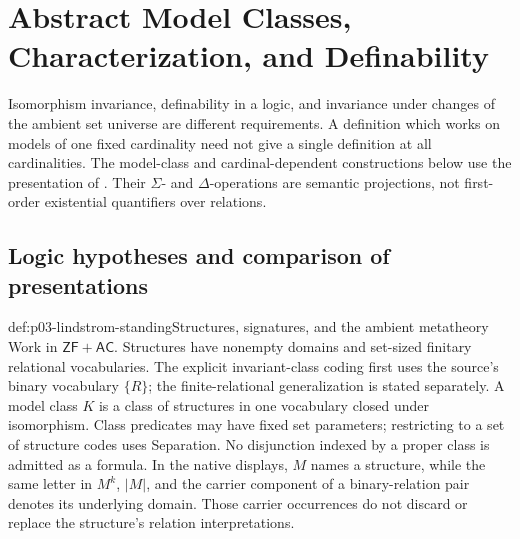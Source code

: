 \section{Abstract Model Classes, Characterization, and Definability}
\label{sec:p03-lindstrom-continuation}

Isomorphism invariance, definability in a logic, and invariance under changes
of the ambient set universe are different requirements. A definition which
works on models of one fixed cardinality need not give a single definition
at all cardinalities. The model-class and cardinal-dependent constructions
below use the presentation of
\cite[\S2, Theorems~2 and~7; \S5, Theorem~18]{KennedyVaananen2021LogicalityV1}.
Their \(\Sigma\)- and \(\Delta\)-operations are semantic projections,
not first-order existential quantifiers over relations.

\subsection{Logic hypotheses and comparison of presentations}

\begin{hbconvention}{def:p03-lindstrom-standing}{Structures, signatures, and the ambient metatheory}
Work in \(\mathsf{ZF}+\mathsf{AC}\). Structures have nonempty domains
and set-sized finitary relational vocabularies. The explicit invariant-class
coding first uses the source's binary vocabulary \(\{R\}\); the
finite-relational generalization is stated separately. A model class \(K\)
is a class of structures in one vocabulary closed under isomorphism.
Class predicates may have fixed set parameters; restricting to a set of
structure codes uses Separation. No disjunction indexed by a proper class
is admitted as a formula.
In the native displays, \(M\) names a structure, while the same letter
in \(M^k\), \(|M|\), and the carrier component of a binary-relation
pair denotes its underlying domain. Those carrier occurrences do not
discard or replace the structure's relation interpretations.
\end{hbconvention}

